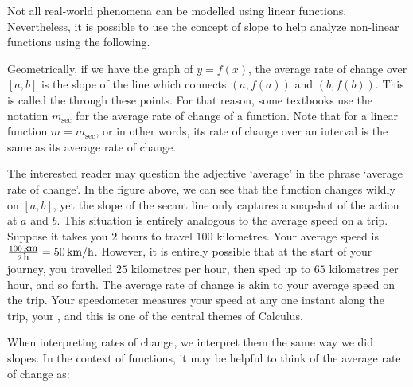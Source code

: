 \medskip

Not all real-world phenomena can be modelled using linear functions.  Nevertheless, it is possible to use the concept of slope to help analyze non-linear functions using the following.

\smallskip


\smallskip

Geometrically, if we have the graph of $y=f(x)$, the average rate of change over $[a,b]$ is the slope of the line which connects $(a,f(a))$ and $(b,f(b))$.  This is called the   through these points.  For that reason, some textbooks use the notation $m_{\sec}$ for the average rate of change of a function.  Note that for a linear function $m = m_{\sec}$, or in other words, its rate of change over an interval is the same as its average rate of change.



The interested reader may question the adjective `average' in the phrase `average rate of change'.  In the figure above, we can see that the function changes wildly on $[a,b]$, yet the slope of the secant line only captures a snapshot of the action at $a$ and $b$.  This situation is entirely analogous to the average speed on a trip.  Suppose it takes you $2$ hours to travel $100$ kilometres.  Your average speed is $\frac{100 \, \mbox{\small km}}{2 \, \mbox{\small h}} = 50 \, \mbox{km/h}$.  However, it is entirely possible that at the start of your journey, you travelled $25$ kilometres per hour, then sped up to $65$ kilometres per hour, and so forth.  The average rate of change is akin to your average speed on the trip.  Your speedometer measures your speed at any one instant along the trip, your , and this is one of the central themes of Calculus.

\label{instantaneousrateofchange}

\smallskip

When interpreting rates of change, we interpret them the same way we did slopes.  In the context of functions, it may be helpful to think of the average rate of change as:

